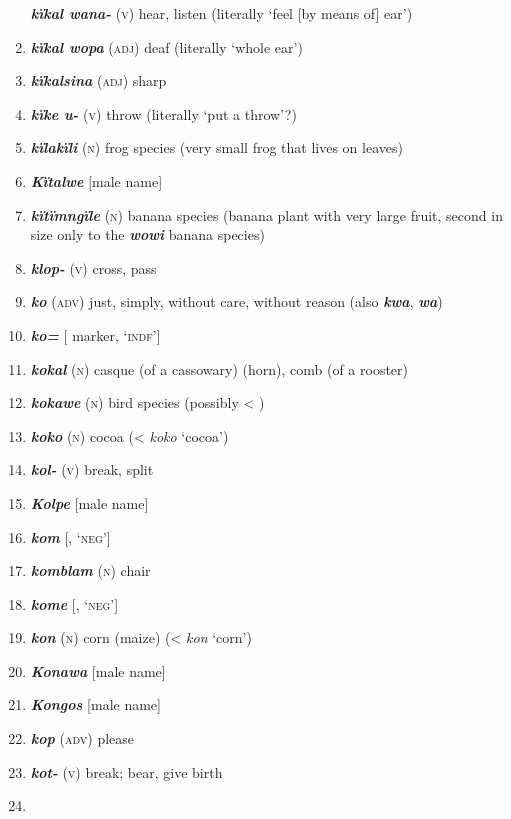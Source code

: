 \begin{enumerate}[noitemsep, label={}, align=left, widest=190, labelsep=1ex,leftmargin=*,itemindent=-10pt]
\textbf{\textit{kïkal wana-}} (\textsc{v}) hear, listen (literally ‘feel [by means of] ear’) \item 
\textbf{\textit{kïkal wopa}} (\textsc{adj}) deaf (literally ‘whole ear’) \item 
\textbf{\textit{kïkalsina}} (\textsc{adj}) sharp \item 
\textbf{\textit{kïke u-}} (\textsc{v}) throw (literally ‘put a throw’?) \item 
\textbf{\textit{kïlakïli}} (\textsc{n}) frog species (very small frog that lives on leaves) \item 
\textbf{\textit{Kïtalwe}} [male name] \item 
\textbf{\textit{kïtïmngïle}} (\textsc{n}) banana species (banana plant with very large fruit, second in size only to the \textbf{\textit{wowi}} banana species) \item 
\textbf{\textit{klop-}} (\textsc{v}) cross, pass \item 
\textbf{\textit{ko}} (\textsc{adv}) just, simply, without care, without reason (also \textbf{\textit{kwa}}, \textbf{\textit{wa}}) \item 
\textbf{\textit{ko=}} [ marker, ‘\textsc{indf}’] \item 
\textbf{\textit{kokal}} (\textsc{n}) casque (of a cassowary) (horn), comb (of a rooster) \item 
\textbf{\textit{kokawe}} (\textsc{n}) bird species (possibly < ) \item 
\textbf{\textit{koko}} (\textsc{n}) cocoa (<  \textit{koko} ‘cocoa’) \item 
\textbf{\textit{kol-}} (\textsc{v}) break, split \item 
\textbf{\textit{Kolpe}} [male name] \item 
\textbf{\textit{kom}} [, ‘\textsc{neg}’] \item 
\textbf{\textit{komblam}} (\textsc{n}) chair \item 
\textbf{\textit{kome}} [, ‘\textsc{neg}’] \item 
\textbf{\textit{kon}} (\textsc{n}) corn (maize) (<  \textit{kon} ‘corn’) \item 
\textbf{\textit{Konawa}} [male name] \item 
\textbf{\textit{Kongos}} [male name] \item 
\textbf{\textit{kop}} (\textsc{adv}) please \item 
\textbf{\textit{kot-}} (\textsc{v}) break; bear, give birth \item 

\end{enumerate}
